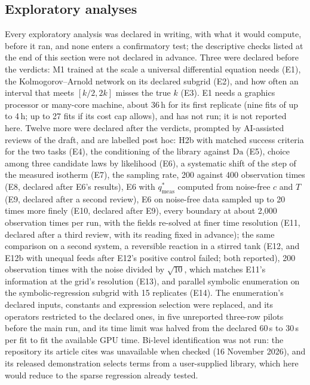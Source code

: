 \documentclass[11pt]{article}
\newcommand{\Da}{\mathrm{Da}}
\newcommand{\qsm}{q^{*}_{\mathrm{meas}}}
\begin{document}
\subsection*{Exploratory analyses}
Every exploratory analysis was declared in writing, with what it would compute, before it ran,
and none enters a confirmatory test; the descriptive checks listed at the end of this section were
not declared in advance. Three were declared before the verdicts: M1 trained at the
scale a universal differential equation needs (E1), the Kolmogorov--Arnold network on its
declared subgrid (E2), and how often an interval that meets $[k/2, 2k]$ misses the true $k$
(E3). E1 needs a graphics processor or many-core machine, about 36\,h for its first replicate (nine
fits of up to 4\,h; up to 27 fits if its cost cap allows), and has not run; it is not reported here. Twelve more were declared after the verdicts, prompted by AI-assisted reviews of the draft, and are labelled post hoc: H2b
with matched success criteria for the two tasks (E4), the conditioning of the library against
$\Da$ (E5), choice among three candidate laws by likelihood (E6), a systematic shift of the step
of the measured isotherm (E7), the sampling rate, 200 against 400 observation times (E8,
declared after E6's results), E6 with $\qsm$ computed from noise-free $c$ and $T$
(E9, declared after a second review), E6 on noise-free data sampled up to 20 times more finely
(E10, declared after E9), every boundary at about 2,000 observation times per run, with the
fields re-solved at finer time resolution (E11, declared after a third review, with its reading
fixed in advance); the same comparison on a second system, a reversible reaction in a
stirred tank (E12, and E12b with unequal feeds after E12's positive control failed; both reported),
200 observation times with the noise divided by $\sqrt{10}$, which matches E11's information at the
grid's resolution (E13), and parallel symbolic enumeration \citep{ruan2026} on the
symbolic-regression subgrid with 15 replicates (E14). The enumeration's declared inputs, constants and expression
selection were replaced, and its operators restricted to the declared ones, in five unreported three-row
pilots before the main run, and its time limit was halved from the declared 60\,s to 30\,s per fit to fit
the available GPU time. Bi-level identification
\citep{li2025bilevel} was not run: the repository its article cites was unavailable when checked
(16 November 2026), and its released demonstration selects terms from a user-supplied library, which here
would reduce to the sparse regression already tested.
\end{document}
